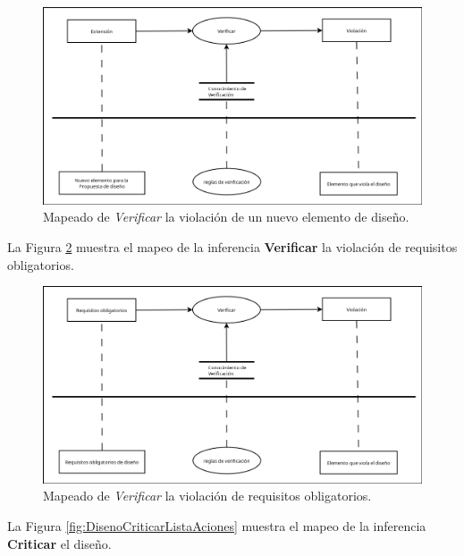 \begin{figure}[H]
  \centering
  \includegraphics[scale=0.35]{imaxes/ExtensionVerificarViolacion.png}
  \caption{\label{fig:ExtensionVerificarViolacion}Mapeado de \textit{Verificar} la violación de un nuevo elemento de diseño.}
\end{figure}

La Figura \ref{fig:RequisitosObligatoriosVerificarViolacion} muestra el mapeo de la inferencia \textbf{Verificar} la violación de requisitos obligatorios.

\begin{figure}[H]
  \centering
  \includegraphics[scale=0.35]{imaxes/RequisitosObligatoriosVerificarViolacion.png}
  \caption{\label{fig:RequisitosObligatoriosVerificarViolacion}Mapeado de \textit{Verificar} la violación de requisitos obligatorios.}
\end{figure}

La Figura \ref{fig:DisenoCriticarListaAciones} muestra el mapeo de la inferencia \textbf{Criticar} el diseño.

